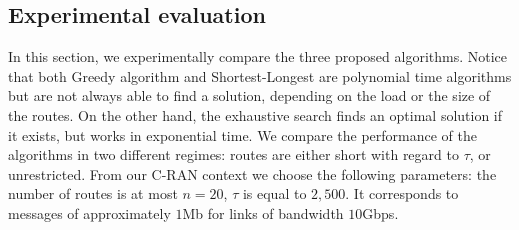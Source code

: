 \documentclass[10pt, conference, letterpaper]{IEEEtran}
\begin{document}
%        
%        
%        
%       
   
   
   
   \subsection{Experimental evaluation}\label{sec:exp_PAZL}
      In this section, we experimentally compare the three proposed algorithms.
      Notice that both Greedy algorithm and Shortest-Longest are polynomial time algorithms but are not always able to find a solution, depending on the load or the size of the routes. On the other hand, the exhaustive search finds an optimal solution if it exists, but works in exponential time. We compare the performance of the algorithms in two different regimes: routes are either short with regard to $\tau$, or unrestricted.
      From our C-RAN context we choose the following parameters: the number of routes is at most $n = 20$, $\tau$ is equal to $2,500$.
      It corresponds to messages of approximately $1$Mb for links of bandwidth $10$Gbps.
\end{document}

